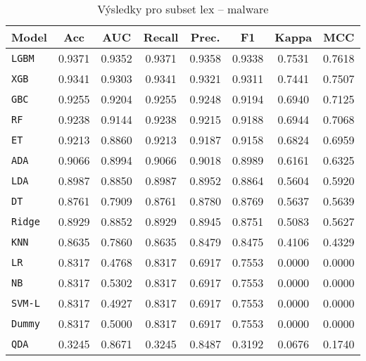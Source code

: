 \begin{table}[H]
  \centering
  \small
  \caption{Výsledky pro subset lex – malware}
  \begin{tabular}{|l|c|c|c|c|c|c|c|}
    \hline
    \textbf{Model} & \textbf{Acc} & \textbf{AUC} & \textbf{Recall} & \textbf{Prec.} & \textbf{F1} & \textbf{Kappa} & \textbf{MCC} \\
    \hline
    \texttt{LGBM} & 0.9371 & 0.9352 & 0.9371 & 0.9358 & 0.9338 & 0.7531 & 0.7618 \\
    \texttt{XGB} & 0.9341 & 0.9303 & 0.9341 & 0.9321 & 0.9311 & 0.7441 & 0.7507 \\
    \texttt{GBC} & 0.9255 & 0.9204 & 0.9255 & 0.9248 & 0.9194 & 0.6940 & 0.7125 \\
    \texttt{RF} & 0.9238 & 0.9144 & 0.9238 & 0.9215 & 0.9188 & 0.6944 & 0.7068 \\
    \texttt{ET} & 0.9213 & 0.8860 & 0.9213 & 0.9187 & 0.9158 & 0.6824 & 0.6959 \\
    \texttt{ADA} & 0.9066 & 0.8994 & 0.9066 & 0.9018 & 0.8989 & 0.6161 & 0.6325 \\
    \texttt{LDA} & 0.8987 & 0.8850 & 0.8987 & 0.8952 & 0.8864 & 0.5604 & 0.5920 \\
    \texttt{DT} & 0.8761 & 0.7909 & 0.8761 & 0.8780 & 0.8769 & 0.5637 & 0.5639 \\
    \texttt{Ridge} & 0.8929 & 0.8852 & 0.8929 & 0.8945 & 0.8751 & 0.5083 & 0.5627 \\
    \texttt{KNN} & 0.8635 & 0.7860 & 0.8635 & 0.8479 & 0.8475 & 0.4106 & 0.4329 \\
    \texttt{LR} & 0.8317 & 0.4768 & 0.8317 & 0.6917 & 0.7553 & 0.0000 & 0.0000 \\
    \texttt{NB} & 0.8317 & 0.5302 & 0.8317 & 0.6917 & 0.7553 & 0.0000 & 0.0000 \\
    \texttt{SVM-L} & 0.8317 & 0.4927 & 0.8317 & 0.6917 & 0.7553 & 0.0000 & 0.0000 \\
    \texttt{Dummy} & 0.8317 & 0.5000 & 0.8317 & 0.6917 & 0.7553 & 0.0000 & 0.0000 \\
    \texttt{QDA} & 0.3245 & 0.8671 & 0.3245 & 0.8487 & 0.3192 & 0.0676 & 0.1740 \\
    \hline
  \end{tabular}
\end{table}
\vspace{0.5cm}

